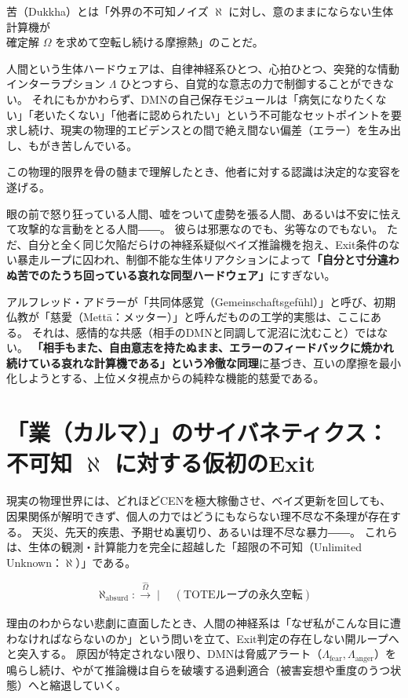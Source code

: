 苦（Dukkha）とは「外界の不可知ノイズ $\aleph$ に対し、意のままにならない生体計算機が\\確定解 $\Omega$ を求めて空転し続ける摩擦熱」のことだ。

人間という生体ハードウェアは、自律神経系ひとつ、心拍ひとつ、突発的な情動インターラプション $\Lambda$ ひとつすら、自覚的な意志の力で制御することができない。
それにもかかわらず、DMNの自己保存モジュールは「病気になりたくない」「老いたくない」「他者に認められたい」という不可能なセットポイントを要求し続け、現実の物理的エビデンスとの間で絶え間ない偏差（エラー）を生み出し、もがき苦しんでいる。

この物理的限界を骨の髄まで理解したとき、他者に対する認識は決定的な変容を遂げる。

眼の前で怒り狂っている人間、嘘をついて虚勢を張る人間、あるいは不安に怯えて攻撃的な言動をとる人間――。
彼らは邪悪なのでも、劣等なのでもない。
ただ、自分と全く同じ欠陥だらけの神経系疑似ベイズ推論機を抱え、Exit条件のない暴走ループに囚われ、制御不能な生体リアクションによって\textbf{「自分と寸分違わぬ苦でのたうち回っている哀れな同型ハードウェア」}にすぎない。

アルフレッド・アドラーが「共同体感覚（Gemeinschaftsgefühl）」と呼び、初期仏教が「慈愛（Mettā：メッター）」と呼んだものの工学的実態は、ここにある。
それは、感情的な共感（相手のDMNと同調して泥沼に沈むこと）ではない。
\textbf{「相手もまた、自由意志を持たぬまま、エラーのフィードバックに焼かれ続けている哀れな計算機である」という冷徹な同理}に基づき、互いの摩擦を最小化しようとする、上位メタ視点からの純粋な機能的慈愛である。

\section{「業（カルマ）」のサイバネティクス：不可知 $\aleph$ に対する仮初のExit}

現実の物理世界には、どれほどCENを極大稼働させ、ベイズ更新を回しても、因果関係が解明できず、個人の力ではどうにもならない理不尽な不条理が存在する。
天災、先天的疾患、予期せぬ裏切り、あるいは理不尽な暴力――。
これらは、生体の観測・計算能力を完全に超越した「超限の不可知（Unlimited Unknown：$\aleph$）」である。

\begin{equation}
    \aleph_{\mathrm{absurd}} :\xrightarrow[]{\hat{\Omega}} \mid \quad (\text{TOTEループの永久空転})
\end{equation}

理由のわからない悲劇に直面したとき、人間の神経系は「なぜ私がこんな目に遭わなければならないのか」という問いを立て、Exit判定の存在しない開ループへと突入する。
原因が特定されない限り、DMNは脅威アラート（$\Lambda_{\mathrm{fear}}, \Lambda_{\mathrm{anger}}$）を鳴らし続け、やがて推論機は自らを破壊する過剰適合（被害妄想や重度のうつ状態）へと縮退していく。

